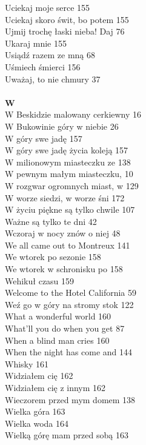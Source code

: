 \documentclass[a5paper, 10pt]{book}
\begin{document}
{\begin{multicols}{3}
    Uciekaj moje serce 155\\
    Uciekaj skoro świt, bo potem 155\\
    Ujmij trochę łaski nieba! Daj 76\\
    Ukaraj mnie 155\\
    Usiądź razem ze mną 68\\
    Uśmiech śmierci 156\\
    Uważaj, to nie chmury 37\\
    \\
    {\footnotesize \textbf{W\\} }
    W Beskidzie malowany cerkiewny 16\\
    W Bukowinie góry w niebie 26\\
    W góry swe jadę 157\\
    W góry swe jadę życia koleją 157\\
    W milionowym miasteczku ze 138\\
    W pewnym małym miasteczku, 10\\
    W rozgwar ogromnych miast, w 129\\
    W worze siedzi, w worze śni 172\\
    W życiu piękne są tylko chwile 107\\
    Ważne są tylko te dni 42\\
    Wczoraj w nocy znów o niej 48\\
    We all came out to Montreux 141\\
    We wtorek po sezonie 158\\
    We wtorek w schronisku po 158\\
    Wehikuł czasu 159\\
    Welcome to the Hotel California 59\\
    Weź go w góry na stromy stok 122\\
    What a wonderful world 160\\
    What'll you do when you get 87\\
    When a blind man cries 160\\
    When the night has come and 144\\
    Whisky 161\\
    Widziałem cię 162\\
    Widziałem cię z innym 162\\
    Wieczorem przed mym domem 138\\
    Wielka góra 163\\
    Wielka woda 164\\
    Wielką górę mam przed sobą 163\\

\end{multicols}}
\end{document}
